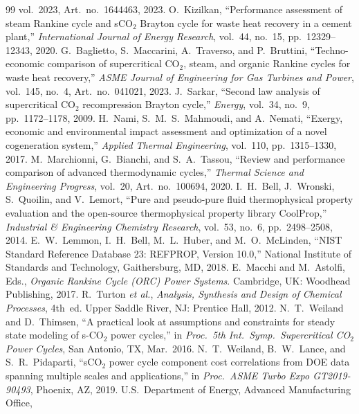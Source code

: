 \documentclass[12pt,a4paper]{report}
\begin{document}
\begin{thebibliography}{99}
vol.~2023, Art.\ no.~1644463, 2023.
O.~Kizilkan,
``Performance assessment of steam Rankine cycle and sCO$_2$ Brayton cycle
for waste heat recovery in a cement plant,''
\textit{International Journal of Energy Research},
vol.~44, no.~15, pp.~12329--12343, 2020.
G.~Baglietto, S.~Maccarini, A.~Traverso, and P.~Bruttini,
``Techno-economic comparison of supercritical CO$_2$, steam, and organic
Rankine cycles for waste heat recovery,''
\textit{ASME Journal of Engineering for Gas Turbines and Power},
vol.~145, no.~4, Art.\ no.~041021, 2023.
J.~Sarkar,
``Second law analysis of supercritical CO$_2$ recompression Brayton cycle,''
\textit{Energy}, vol.~34, no.~9, pp.~1172--1178, 2009.
H.~Nami, S.~M.~S.~Mahmoudi, and A.~Nemati,
``Exergy, economic and environmental impact assessment and optimization
of a novel cogeneration system,''
\textit{Applied Thermal Engineering}, vol.~110, pp.~1315--1330, 2017.
M.~Marchionni, G.~Bianchi, and S.~A.~Tassou,
``Review and performance comparison of advanced thermodynamic cycles,''
\textit{Thermal Science and Engineering Progress},
vol.~20, Art.\ no.~100694, 2020.
I.~H.~Bell, J.~Wronski, S.~Quoilin, and V.~Lemort,
``Pure and pseudo-pure fluid thermophysical property evaluation and the
open-source thermophysical property library CoolProp,''
\textit{Industrial \& Engineering Chemistry Research},
vol.~53, no.~6, pp.~2498--2508, 2014.
E.~W.~Lemmon, I.~H.~Bell, M.~L.~Huber, and M.~O.~McLinden,
``NIST Standard Reference Database 23: REFPROP, Version 10.0,''
National Institute of Standards and Technology, Gaithersburg, MD, 2018.
E.~Macchi and M.~Astolfi, Eds.,
\textit{Organic Rankine Cycle (ORC) Power Systems}.
Cambridge, UK: Woodhead Publishing, 2017.
R.~Turton \textit{et al.},
\textit{Analysis, Synthesis and Design of Chemical Processes}, 4th~ed.
Upper Saddle River, NJ: Prentice Hall, 2012.
N.~T.~Weiland and D.~Thimsen,
``A practical look at assumptions and constraints for steady state modeling
of s-CO$_2$ power cycles,''
in \textit{Proc.\ 5th Int.\ Symp.\ Supercritical CO$_2$ Power Cycles},
San Antonio, TX, Mar.\ 2016.
N.~T.~Weiland, B.~W.~Lance, and S.~R.~Pidaparti,
``sCO$_2$ power cycle component cost correlations from DOE data spanning
multiple scales and applications,''
in \textit{Proc.\ ASME Turbo Expo GT2019-90493}, Phoenix, AZ, 2019.
U.S.\ Department of Energy, Advanced Manufacturing Office,

\end{thebibliography}
\end{document}
